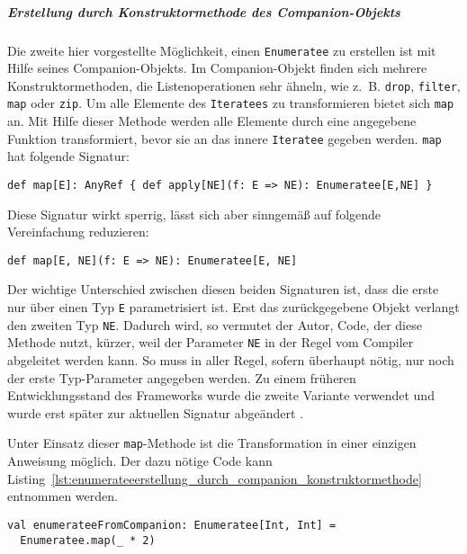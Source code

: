 \documentclass[draft=false
              ,paper=a4
              ,twoside=false
              ,fontsize=11pt
              ,headsepline
              ,BCOR10mm
              ,DIV11
              ]{scrbook}
\begin{document}

\subparagraph{Erstellung durch Konstruktormethode des Companion-Objekts} %
\label{subp:enumerateeerstellung_durch_konstruktormethode_des_companion_objekts}\mbox{} %

Die zweite hier vorgestellte Möglichkeit, einen \lstinline|Enumeratee| zu erstellen ist mit Hilfe seines Companion-Objekts.
Im Companion-Objekt finden sich mehrere Konstruktormethoden, die Listenoperationen sehr ähneln, wie z.~B. \lstinline|drop|, \lstinline|filter|, \lstinline|map| oder \lstinline|zip|.
Um alle Elemente des \lstinline|Iteratees| zu transformieren bietet sich \lstinline|map| an.
Mit Hilfe dieser Methode werden alle Elemente durch eine angegebene Funktion transformiert, bevor sie an das innere \lstinline|Iteratee| gegeben werden.
\lstinline|map| hat folgende Signatur:
\begin{lstlisting}
def map[E]: AnyRef { def apply[NE](f: E => NE): Enumeratee[E,NE] }
\end{lstlisting}
Diese Signatur wirkt sperrig, lässt sich aber sinngemäß auf folgende Vereinfachung reduzieren:
\begin{lstlisting}
def map[E, NE](f: E => NE): Enumeratee[E, NE]
\end{lstlisting}

Der wichtige Unterschied zwischen diesen beiden Signaturen ist, dass die erste nur über einen Typ \lstinline|E| parametrisiert ist.
Erst das zurückgegebene Objekt verlangt den zweiten Typ \lstinline|NE|.
Dadurch wird, so vermutet der Autor, Code, der diese Methode nutzt, kürzer, weil der Parameter \lstinline|NE| in der Regel vom Compiler abgeleitet werden kann.
So muss in aller Regel, sofern überhaupt nötig, nur noch der erste Typ-Parameter angegeben werden.
Zu einem früheren Entwicklungsstand des Frameworks wurde die zweite Variante verwendet und wurde erst später zur aktuellen Signatur abgeändert \cite[vgl.][]{play_enumeratee_map_signatur}.

Unter Einsatz dieser \lstinline|map|-Methode ist die Transformation in einer einzigen Anweisung möglich.
Der dazu nötige Code kann Listing~\ref{lst:enumerateeerstellung_durch_companion_konstruktormethode} entnommen werden.

\begin{lstlisting}[caption=Erstellung eines Enumeratees durch die map-Konstruktormethode, label=lst:enumerateeerstellung_durch_companion_konstruktormethode]
val enumerateeFromCompanion: Enumeratee[Int, Int] =
  Enumeratee.map(_ * 2)
\end{lstlisting}
\end{document}
